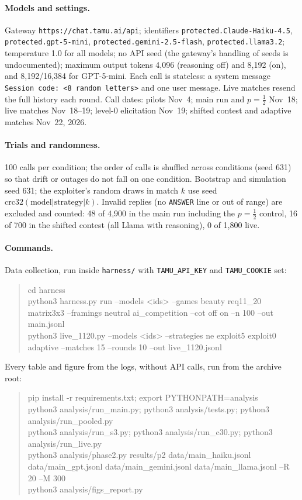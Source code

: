 \documentclass[11pt]{article}
\begin{document}
\paragraph{Models and settings.} Gateway \texttt{https://chat.tamu.ai/api}; identifiers \texttt{protected.Claude-Haiku-4.5}, \texttt{protected.gpt-5-mini}, \texttt{protected.gemini-2.5-flash}, \texttt{protected.llama3.2}; temperature 1.0 for all models; no API seed (the gateway's handling of seeds is undocumented); maximum output tokens 4{,}096 (reasoning off) and 8{,}192 (on), and 8{,}192/16{,}384 for GPT-5-mini. Each call is stateless: a system message \texttt{Session code: <8 random letters>} and one user message. Live matches resend the full history each round. Call dates: pilots Nov~4; main run and $p=\tfrac12$ Nov~18; live matches Nov~18--19; level-0 elicitation Nov~19; shifted contest and adaptive matches Nov~22, 2026.

\paragraph{Trials and randomness.} 100 calls per condition; the order of calls is shuffled across conditions (seed 631) so that drift or outages do not fall on one condition. Bootstrap and simulation seed 631; the exploiter's random draws in match $k$ use seed $\mathrm{crc32}(\text{model}|\text{strategy}|k)$. Invalid replies (no \texttt{ANSWER} line or out of range) are excluded and counted: 48 of 4{,}900 in the main run including the $p=\tfrac12$ control, 16 of 700 in the shifted contest (all Llama with reasoning), 0 of 1{,}800 live.

\paragraph{Commands.} Data collection, run inside \texttt{harness/} with \texttt{TAMU\_API\_KEY} and \texttt{TAMU\_COOKIE} set:
\begin{quote}\small\ttfamily\raggedright
cd harness\\
python3 harness.py run --models <ids> --games beauty req11\_20 matrix3x3 --framings neutral ai\_competition --cot off on --n 100 --out main.jsonl\\
python3 live\_1120.py --models <ids> --strategies ne exploit5 exploit0 adaptive --matches 15 --rounds 10 --out live\_1120.jsonl
\end{quote}
Every table and figure from the logs, without API calls, run from the archive root:
\begin{quote}\small\ttfamily\raggedright
pip install -r requirements.txt; export PYTHONPATH=analysis\\
python3 analysis/run\_main.py; python3 analysis/tests.py; python3 analysis/run\_pooled.py\\
python3 analysis/run\_s3.py; python3 analysis/run\_c30.py; python3 analysis/run\_live.py\\
python3 analysis/phase2.py results/p2 data/main\_haiku.jsonl data/main\_gpt.jsonl data/main\_gemini.jsonl data/main\_llama.jsonl --R 20 --M 300\\
python3 analysis/figs\_report.py
\end{quote}
\end{document}
